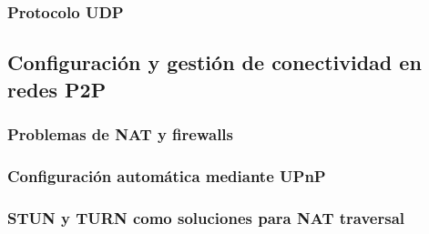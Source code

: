 %
%
%


\subsubsection{Protocolo UDP}

\subsection{Configuración y gestión de conectividad en redes P2P}
\subsubsection{Problemas de NAT y firewalls}
\subsubsection{Configuración automática mediante UPnP}
\subsubsection{STUN y TURN como soluciones para NAT traversal}
